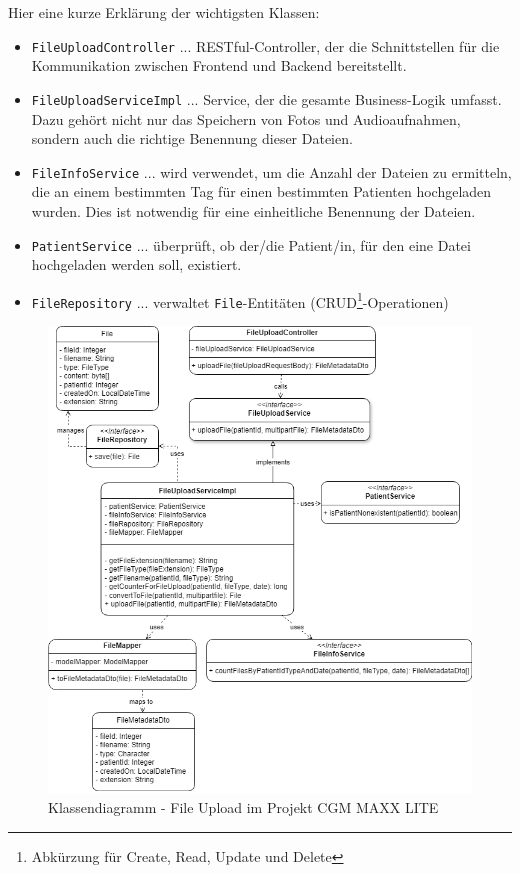         Hier eine kurze Erklärung der wichtigsten Klassen:
        \begin{itemize}
            \item \lstinline{FileUploadController} ... RESTful-Controller, der die Schnittstellen für die Kommunikation zwischen Frontend und Backend bereitstellt.
            
            \item \lstinline{FileUploadServiceImpl} ... Service, der die gesamte Business-Logik umfasst. Dazu gehört nicht nur das Speichern von Fotos und Audioaufnahmen, sondern auch die richtige Benennung dieser Dateien.
            
            \item \lstinline{FileInfoService} ... wird verwendet, um die Anzahl der Dateien zu ermitteln, die an einem bestimmten Tag für einen bestimmten Patienten hochgeladen wurden. Dies ist notwendig für eine einheitliche Benennung der Dateien.
            
            \item \lstinline{PatientService} ... überprüft, ob der/die Patient/in, für den eine Datei hochgeladen werden soll, existiert.
            
            \item \lstinline{FileRepository} ... verwaltet \lstinline{File}-Entitäten (CRUD\footnote{Abkürzung für Create, Read, Update und Delete}-Operationen)
        \end{itemize}
    
        \begin{figure}[H]
            \centering
            \includegraphics[width=1\linewidth]{images/EA/uml-class-diagram.png}
            \caption{Klassendiagramm - File Upload im Projekt CGM MAXX LITE}
            \label{fig:class-diagram-file-upload}
        \end{figure}

